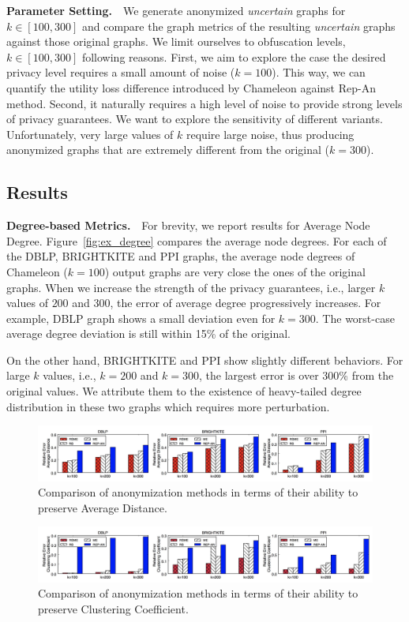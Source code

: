 \textbf{Parameter Setting.}~~We generate anonymized \emph{uncertain} graphs for $k \in [100,300]$ and compare the graph metrics of the resulting \emph{uncertain} graphs against those original graphs. We limit ourselves to obfuscation levels, $k \in [100,300]$ following reasons. 
First, we aim to explore the case the desired privacy level requires a small amount of noise ($k=100$). This way, we can quantify the utility loss difference introduced by Chameleon against Rep-An method. Second, it naturally requires a high level of noise to provide strong levels of privacy guarantees. We want to explore the sensitivity of different variants. Unfortunately, very large values of $k$ require large noise, thus producing anonymized graphs that are extremely different from the original ($k=300$). 


\subsection{Results}
\textbf{Degree-based Metrics.}~~For brevity, we report results for  Average Node Degree. 
Figure~\ref{fig:ex_degree} compares the average node degrees. For each of the DBLP, BRIGHTKITE and PPI graphs, the average node degrees of Chameleon ($k=100$) output graphs are very close the ones of the original graphs. When we increase the strength of the privacy guarantees, i.e., larger $k$ values of $200$ and $300$, the error of average degree progressively increases. For example, DBLP graph shows a small deviation even for $k=300$. The worst-case average degree deviation is still within 15\% of the original. 

On the other hand, BRIGHTKITE and PPI show slightly different behaviors. For large $k$ values, i.e., $k=200$ and $k=300$, the largest error is over 300\% from the original values. We attribute them to the existence of heavy-tailed degree distribution in these two graphs which requires more perturbation. 
\begin{figure}[!tb]
    \centering
    \includegraphics[width=\linewidth]{exp/exp_apd.jpg}
    \caption{Comparison of anonymization methods in terms of their ability to preserve Average Distance.}
    \label{fig:ex_apd}
\end{figure}
\begin{figure}[!tb]
    \centering
    \includegraphics[width=\linewidth]{exp/exp_cc.jpg}
    \caption{Comparison of anonymization methods in terms of their ability to preserve Clustering Coefficient.}
    \label{fig:ex_cc}
\end{figure}

